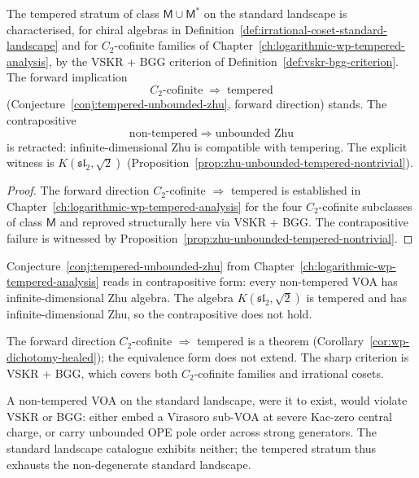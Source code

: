 \begin{corollary}
\label{cor:tempered-criterion-refined}
\ClaimStatusConditional
The tempered stratum of class $\mathsf{M} \cup \mathsf{M}^*$ on the
standard landscape is characterised, for chiral algebras in
Definition~\ref{def:irrational-coset-standard-landscape} and for
$C_2$-cofinite families of
Chapter~\ref{ch:logarithmic-wp-tempered-analysis}, by the VSKR + BGG
criterion of Definition~\ref{def:vskr-bgg-criterion}. The forward
implication
\[
 C_2\text{-cofinite} \;\Longrightarrow\; \text{tempered}
\]
(Conjecture~\ref{conj:tempered-unbounded-zhu}, forward direction)
stands. The contrapositive
\[
 \text{non-tempered} \;\Longrightarrow\; \text{unbounded Zhu}
\]
is retracted: infinite-dimensional Zhu is compatible with tempering.
The explicit witness is $K(\mathfrak{sl}_2, \sqrt{2})$
(Proposition~\ref{prop:zhu-unbounded-tempered-nontrivial}).
\end{corollary}

\begin{proof}
The forward direction $C_2$-cofinite $\Longrightarrow$ tempered
is established in Chapter~\ref{ch:logarithmic-wp-tempered-analysis}
for the four $C_2$-cofinite subclasses of class $\mathsf{M}$ and
reproved structurally here via VSKR + BGG. The contrapositive
failure is witnessed by
Proposition~\ref{prop:zhu-unbounded-tempered-nontrivial}.
\end{proof}

\begin{remark}
\label{rem:conjecture-tempered-unbounded-zhu-retracted}
Conjecture~\ref{conj:tempered-unbounded-zhu} from
Chapter~\ref{ch:logarithmic-wp-tempered-analysis} reads in
contrapositive form: every non-tempered VOA has infinite-dimensional
Zhu algebra. The algebra $K(\mathfrak{sl}_2, \sqrt{2})$ is tempered
and has infinite-dimensional Zhu, so the contrapositive does not
hold.

The forward direction $C_2$-cofinite $\Longrightarrow$ tempered is a
theorem (Corollary~\ref{cor:wp-dichotomy-healed}); the equivalence
form does not extend. The sharp criterion is VSKR + BGG, which covers
both $C_2$-cofinite families and irrational cosets.

A non-tempered VOA on the standard landscape, were it to exist, would
violate VSKR or BGG: either embed a Virasoro sub-VOA at severe
Kac-zero central charge, or carry unbounded OPE pole order across
strong generators. The standard landscape catalogue exhibits neither;
the tempered stratum thus exhausts the non-degenerate standard
landscape.
\end{remark}

